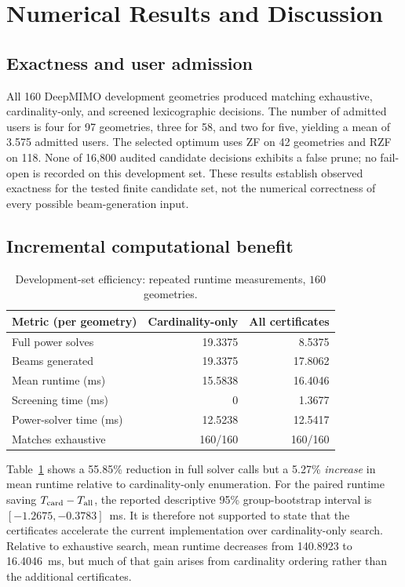 \documentclass[journal]{IEEEtran}
\begin{document}
\section{Numerical Results and Discussion}
\subsection{Exactness and user admission}
All 160 DeepMIMO development geometries produced matching exhaustive, cardinality-only, and screened lexicographic decisions. The number of admitted users is four for 97 geometries, three for 58, and two for five, yielding a mean of 3.575 admitted users. The selected optimum uses ZF on 42 geometries and RZF on 118. None of 16,800 audited candidate decisions exhibits a false prune; no fail-open is recorded on this development set. These results establish observed exactness for the tested finite candidate set, not the numerical correctness of every possible beam-generation input.

\subsection{Incremental computational benefit}
\begin{table}[t]
\caption{Development-set efficiency: repeated runtime measurements, $160$ geometries.}
\label{tab:main}
\centering\footnotesize
\begin{tabular}{lrr}
\toprule
Metric (per geometry) & Cardinality-only & All certificates\\
\midrule
Full power solves & 19.3375 & 8.5375\\
Beams generated & 19.3375 & 17.8062\\
Mean runtime (ms) & 15.5838 & 16.4046\\
Screening time (ms) & 0 & 1.3677\\
Power-solver time (ms) & 12.5238 & 12.5417\\
Matches exhaustive & 160/160 & 160/160\\
\bottomrule
\end{tabular}
\end{table}

Table~\ref{tab:main} shows a 55.85\% reduction in full solver calls but a 5.27\% \emph{increase} in mean runtime relative to cardinality-only enumeration. For the paired runtime saving $T_{\rm card}-T_{\rm all}$, the reported descriptive 95\% group-bootstrap interval is $[-1.2675,-0.3783]$~ms. It is therefore not supported to state that the certificates accelerate the current implementation over cardinality-only search. Relative to exhaustive search, mean runtime decreases from 140.8923 to 16.4046~ms, but much of that gain arises from cardinality ordering rather than the additional certificates.
\end{document}
